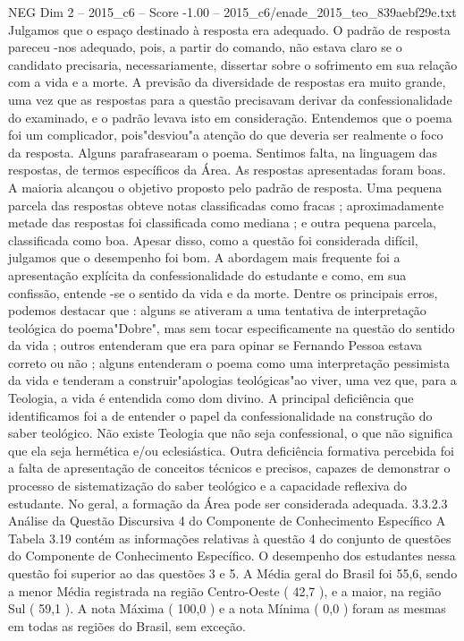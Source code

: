 \begin{textsample}{NEG Dim 2 – 2015\_c6 – Score -1.00 – 2015\_c6/enade\_2015\_teo\_839aebf29e.txt}
Julgamos que o espaço destinado à resposta era adequado.
O padrão de resposta pareceu -nos adequado, pois, a partir do comando, não estava claro se o candidato precisaria, necessariamente, dissertar sobre o sofrimento em sua relação com a vida e a morte.
A previsão da diversidade de respostas era muito grande, uma vez que as respostas para a questão precisavam derivar da confessionalidade do examinado, e o padrão levava isto em consideração.
Entendemos que o poema foi um complicador, pois"desviou"a atenção do que deveria ser realmente o foco da resposta.
Alguns parafrasearam o poema.
Sentimos falta, na linguagem das respostas, de termos específicos da Área.
As respostas apresentadas foram boas.
A maioria alcançou o objetivo proposto pelo padrão de resposta.
Uma pequena parcela das respostas obteve notas classificadas como fracas ; aproximadamente metade das respostas foi classificada como mediana ; e outra pequena parcela, classificada como boa.
Apesar disso, como a questão foi considerada difícil, julgamos que o desempenho foi bom.
A abordagem mais frequente foi a apresentação explícita da confessionalidade do estudante e como, em sua confissão, entende -se o sentido da vida e da morte.
Dentre os principais erros, podemos destacar que : alguns se ativeram a uma tentativa de interpretação teológica do poema"Dobre", mas sem tocar especificamente na questão do sentido da vida ; outros entenderam que era para opinar se Fernando Pessoa estava correto ou não ; alguns entenderam o poema como uma interpretação pessimista da vida e tenderam a construir"apologias teológicas"ao viver, uma vez que, para a Teologia, a vida é entendida como dom divino.
A principal deficiência que identificamos foi a de entender o papel da confessionalidade na construção do saber teológico.
Não existe Teologia que não seja confessional, o que não significa que ela seja hermética e/ou eclesiástica.
Outra deficiência formativa percebida foi a falta de apresentação de conceitos técnicos e precisos, capazes de demonstrar o processo de sistematização do saber teológico e a capacidade reflexiva do estudante.
No geral, a formação da Área pode ser considerada adequada. 3.3.2.3 Análise da Questão Discursiva 4 do Componente de Conhecimento Específico A Tabela 3.19 contém as informações relativas à questão 4 do conjunto de questões do Componente de Conhecimento Específico.
O desempenho dos estudantes nessa questão foi superior ao das questões 3 e 5.
A Média geral do Brasil foi 55,6, sendo a menor Média registrada na região Centro-Oeste ( 42,7 ), e a maior, na região Sul ( 59,1 ).
A nota Máxima ( 100,0 ) e a nota Mínima ( 0,0 ) foram as mesmas em todas as regiões do Brasil, sem exceção.

\end{textsample}
